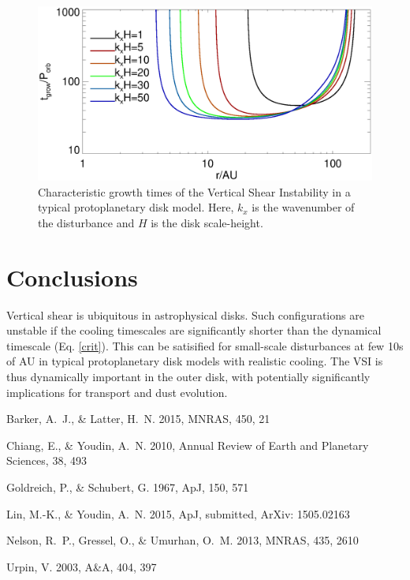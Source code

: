 \documentclass{iau}
\newcommand{\apj}{ApJ}
\newcommand{\mnras}{MNRAS}
\newcommand{\aap}{A\&A}
\begin{document}
\begin{figure}
  \begin{center}
    \includegraphics[width=\linewidth]{eigen_compare_grow.ps} 
    \caption{Characteristic growth times of the Vertical Shear
      Instability in a typical protoplanetary disk model. Here, $k_x$
      is the wavenumber of the disturbance and $H$ is the disk
      scale-height. 
      \label{mmsn}}
  \end{center}
\end{figure}

\section{Conclusions}
Vertical shear is ubiquitous in astrophysical disks. Such
configurations are unstable if the cooling timescales are
significantly shorter than the dynamical timescale (Eq. \ref{crit}). 
This can be satisified for small-scale disturbances at few 10s
of AU in typical protoplanetary disk 
models with realistic cooling. The VSI is thus dynamically important
in the outer disk, with potentially significantly implications for
transport and dust evolution. 





\begin{thebibliography}{}
  
  {Barker}, A.~J., \& {Latter}, H.~N. 2015, \mnras, 450, 21 
  
  {Chiang}, E., \& {Youdin}, A.~N. 2010, Annual Review of Earth and Planetary
  Sciences, 38, 493
  
  {Goldreich}, P., \& {Schubert}, G. 1967, \apj, 150, 571
  
  {Lin}, M.-K., \& {Youdin}, A.~N. 2015, \apj, submitted, ArXiv: 1505.02163
  
  {Nelson}, R.~P., {Gressel}, O., \& {Umurhan}, O.~M. 2013, \mnras, 435, 2610
  
  {Urpin}, V. 2003, \aap, 404, 397
\end{thebibliography}

% 
% 
\end{document}
